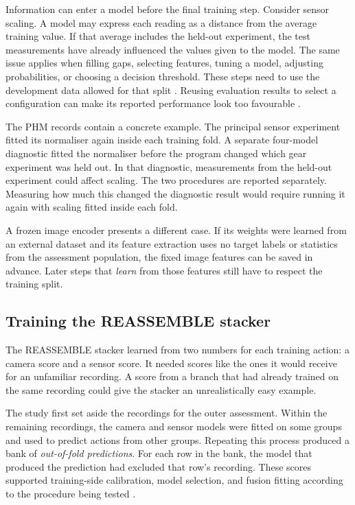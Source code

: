 Information can enter a model before the final training step. Consider sensor scaling. A model may express each reading as a distance from the average training value. If that average includes the held-out experiment, the test measurements have already influenced the values given to the model. The same issue applies when filling gaps, selecting features, tuning a model, adjusting probabilities, or choosing a decision threshold. These steps need to use the development data allowed for that split \parencite{P017}. Reusing evaluation results to select a configuration can make its reported performance look too favourable \parencite{P004}.

The PHM records contain a concrete example. The principal sensor experiment fitted its normaliser again inside each training fold. A separate four-model diagnostic fitted the normaliser before the program changed which gear experiment was held out. In that diagnostic, measurements from the held-out experiment could affect scaling. The two procedures are reported separately. Measuring how much this changed the diagnostic result would require running it again with scaling fitted inside each fold.

A frozen image encoder presents a different case. If its weights were learned from an external dataset and its feature extraction uses no target labels or statistics from the assessment population, the fixed image features can be saved in advance. Later steps that \emph{learn} from those features still have to respect the training split.

\subsection{Training the REASSEMBLE stacker}

The REASSEMBLE stacker learned from two numbers for each training action: a camera score and a sensor score. It needed scores like the ones it would receive for an unfamiliar recording. A score from a branch that had already trained on the same recording could give the stacker an unrealistically easy example.

The study first set aside the recordings for the outer assessment. Within the remaining recordings, the camera and sensor models were fitted on some groups and used to predict actions from other groups. Repeating this process produced a bank of \emph{out-of-fold predictions}. For each row in the bank, the model that produced the prediction had excluded that row’s recording. These scores supported training-side calibration, model selection, and fusion fitting according to the procedure being tested \parencite{Ting1999Issues}.

